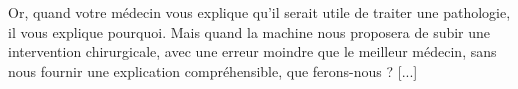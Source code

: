 Or, quand votre médecin vous explique qu’il serait utile de traiter une pathologie, il vous explique pourquoi. Mais quand la machine nous proposera de subir une intervention chirurgicale, avec une erreur moindre que le meilleur médecin, sans nous fournir une explication compréhensible, que ferons-nous ? [...]






